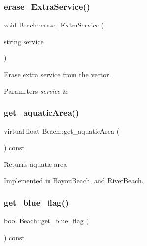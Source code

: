 \subsubsection{\texorpdfstring{erase\+\_\+\+Extra\+Service()}{erase\_ExtraService()}}
{\footnotesize\ttfamily void Beach\+::erase\+\_\+\+Extra\+Service (\begin{DoxyParamCaption}\item[{string}]{service }\end{DoxyParamCaption})}



Erase extra service from the vector. 


\begin{DoxyParams}{Parameters}
{\em service} & \\
\hline
\end{DoxyParams}
\mbox{\label{class_beach_afc6a57f98777ec5de1882acaf2703e6d}} 
\subsubsection{\texorpdfstring{get\+\_\+aquatic\+Area()}{get\_aquaticArea()}}
{\footnotesize\ttfamily virtual float Beach\+::get\+\_\+aquatic\+Area (\begin{DoxyParamCaption}{ }\end{DoxyParamCaption}) const\hspace{0.3cm}{\ttfamily [pure virtual]}}

\begin{DoxyReturn}{Returns}
aquatic area 
\end{DoxyReturn}


Implemented in \hyperlink{class_bayou_beach_ae2dc0496a300f7f8828a7b5898a68ee1}{Bayou\+Beach}, and \hyperlink{class_river_beach_a4bd144e5631968ed671051a203f1bce3}{River\+Beach}.

\mbox{\label{class_beach_a6f3155d6b2a779d27b619d87775ff62b}} 
\subsubsection{\texorpdfstring{get\+\_\+blue\+\_\+flag()}{get\_blue\_flag()}}
{\footnotesize\ttfamily bool Beach\+::get\+\_\+blue\+\_\+flag (\begin{DoxyParamCaption}{ }\end{DoxyParamCaption}) const}

